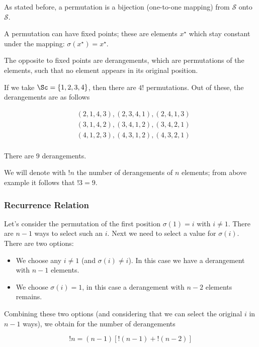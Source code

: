 
As stated before, a permutation is a bijection (one-to-one mapping) from $\mathcal{S}$ onto $\mathcal{S}$.

A permutation can have fixed points; these are elements $x^\star$ which stay constant under the mapping: $\sigma(x^\star) = x^\star$.

The opposite to fixed points are derangements, which are permutations of the elements, such that no element appears in its original position.

If we take $\Sc = \{1,2,3,4\}$, then there are $4!$ permutations. Out of these, the derangements are as follows

\begin{align*}
    & (2,1,4,3), (2,3,4,1), (2,4,1,3) \\
    & (3,1,4,2), (3,4,1,2), (3,4,2,1) \\
    & (4,1,2,3), (4,3,1,2), (4,3,2,1) \\ 
\end{align*}

There are $9$ derangements. 

We will denote with $!n$ the number of derangements of $n$ elements; from above example it follows that $!3 = 9$.

\subsubsection{Recurrence Relation}

Let's consider the permutation of the first position $\sigma(1) = i$ with $i \neq 1$. There are $n-1$ ways to select such an $i$. Next we need to select a value for $\sigma(i)$. There are two options:

\begin{itemize}
    \item We choose any $i \neq 1$ (and $\sigma(i) \neq i$). In this case we have a derangement with $n-1$ elements.
    \item We choose $\sigma(i)=1$, in this case a derangement with $n-2$ elements remains.
\end{itemize}

Combining these two options (and considering that we can select the original $i$ in $n-1$ ways), we obtain for the number of derangements

\begin{equation}
\label{recur}
!n = (n-1) \left[ !(n-1) +  !(n-2)\right]
\end{equation}

